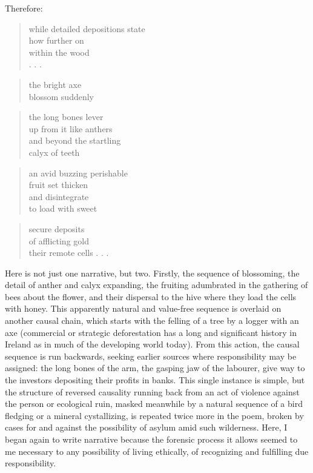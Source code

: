 \documentclass[
]{memoir}
\begin{document}
Therefore:

\begin{verse}
while detailed depositions state\\
how further on\\
within the wood\\
. . .\\
\end{verse}

\begin{verse}
the bright axe\\
blossom suddenly\\
\end{verse}

\begin{verse}
the long bones lever\\
up from it like anthers\\
and beyond the startling\\
calyx of teeth\\
\end{verse}

\begin{verse}
an avid buzzing perishable\\
fruit set thicken\\
and disintegrate\\
to load with sweet\\
\end{verse}

\begin{verse}
secure deposits\\
of afflicting gold\\
their remote cells . . .\\
\end{verse}

Here is not just one narrative, but two. Firstly, the sequence of
blossoming, the detail of anther and calyx expanding, the fruiting
adumbrated in the gathering of bees about the flower, and their
dispersal to the hive where they load the cells with honey. This
apparently natural and value-free sequence is overlaid on another causal
chain, which starts with the felling of a tree by a logger with an axe
(commercial or strategic deforestation has a long and significant
history in Ireland as in much of the developing world today). From this
action, the causal sequence is run backwards, seeking earlier sources
where responsibility may be assigned: the long bones of the arm, the
gasping jaw of the labourer, give way to the investors depositing their
profits in banks. This single instance is simple, but the structure of
reversed causality running back from an act of violence against the
person or ecological ruin, masked meanwhile by a natural sequence of a
bird fledging or a mineral cystallizing, is repeated twice more in the
poem, broken by cases for and against the possibility of asylum amid
such wilderness. Here, I began again to write narrative because the
forensic process it allows seemed to me necessary to any possibility of
living ethically, of recognizing and fulfilling due responsibility.
\end{document}
